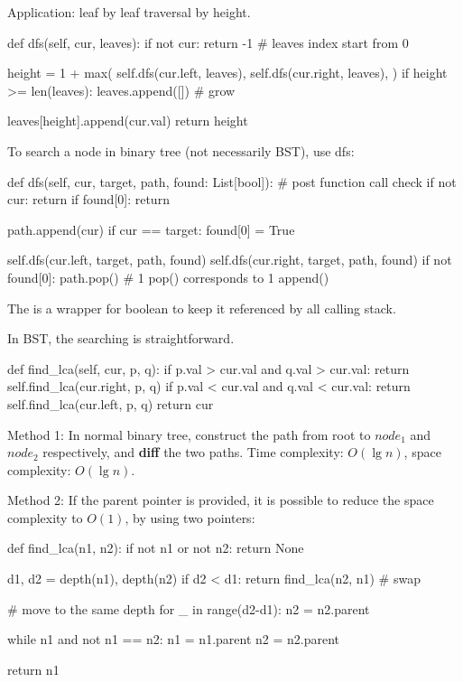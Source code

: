 Application: leaf by leaf traversal by height. 
\begin{python}
def dfs(self, cur, leaves):
    if not cur:
        return -1  # leaves index start from 0

    height = 1 + max(
        self.dfs(cur.left, leaves), 
        self.dfs(cur.right, leaves),
    )
    if height >= len(leaves):
        leaves.append([])  # grow

    leaves[height].append(cur.val)
    return height
\end{python}
 To search a node in binary tree (not necessarily BST), use dfs:
\begin{python}
def dfs(self, cur, target, path, found: List[bool]):
    # post function call check
    if not cur:
      return        
    if found[0]:
      return 

    path.append(cur)
    if cur == target:
        found[0] = True

    self.dfs(cur.left, target, path, found)
    self.dfs(cur.right, target, path, found)
    if not found[0]:
        path.pop()  # 1 pop() corresponds to 1 append()
\end{python}
The  is a wrapper for boolean to keep it referenced by all calling stack. 

 In BST, the searching is straightforward. 
\begin{python}
def find_lca(self, cur, p, q):
    if p.val > cur.val and q.val > cur.val:
        return self.find_lca(cur.right, p, q)
    if p.val < cur.val and q.val < cur.val:
        return self.find_lca(cur.left, p, q)
    return cur
\end{python}

Method 1: In normal binary tree, construct the path from root to $node_1$ and $node_2$ respectively, and \textbf{diff} the two paths. Time complexity: $O(\lg n)$, space complexity: $O(\lg n)$. 

Method 2: If the parent pointer is provided, it is possible to reduce the space complexity to $O(1)$, by using two pointers: 
\begin{python}
def find_lca(n1, n2):
    if not n1 or not n2:
        return None 
        
    d1, d2 = depth(n1), depth(n2)
    if d2 < d1:
        return find_lca(n2, n1)  # swap
        
    # move to the same depth 
    for _ in range(d2-d1):
        n2 = n2.parent  

    while n1 and not n1 == n2:  
        n1 = n1.parent
        n2 = n2.parent
        
    return n1
\end{python}

